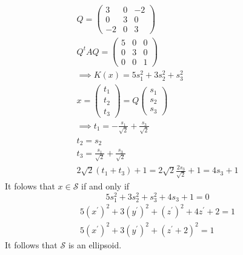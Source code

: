 \begin{gather}
Q = \begin{pmatrix}
3 & 0 & -2\\
0 & 3 & 0\\
-2 & 0 & 3
\end{pmatrix}\\
Q^tAQ = \begin{pmatrix}
5 & 0 & 0\\
0 & 3 & 0\\
0 & 0 & 1
\end{pmatrix}\\
\implies K(x) = 5s_1^2 + 3s_2^2 +s_3^2\\
x = \begin{pmatrix}t_1\\t_2\\t_3\end{pmatrix} =
Q\begin{pmatrix}s_1\\s_2\\s_3\end{pmatrix} \\
\implies t_1 = -\frac{s_1}{\sqrt{2}} + \frac{s_3}{\sqrt{2}}\\
t_2 = s_2\\
t_3 = \frac{s_1}{\sqrt{2}} + \frac{s_3}{\sqrt{2}}\\
2\sqrt{2}(t_1+t_3) +1 = 2\sqrt{2}\frac{2s_3}{\sqrt{2}} + 1 = 4s_3 +1
\end{gather}
It folows that $x \in \mathcal{S}$ if and only if
\begin{equation}
5s_1^2 + 3s_2^2 +s_3^2 + 4s_3 +1 = 0
\end{equation}
\begin{gather}
5(x^\prime)^2 +3(y^\prime)^2 +(z^\prime)^2 +4z^\prime +2 = 1\\
5(x^\prime)^2 +3(y^\prime)^2 +(z^\prime+2)^2 =1
\end{gather}
It follows that $\mathcal{S}$ is an ellipsoid.

